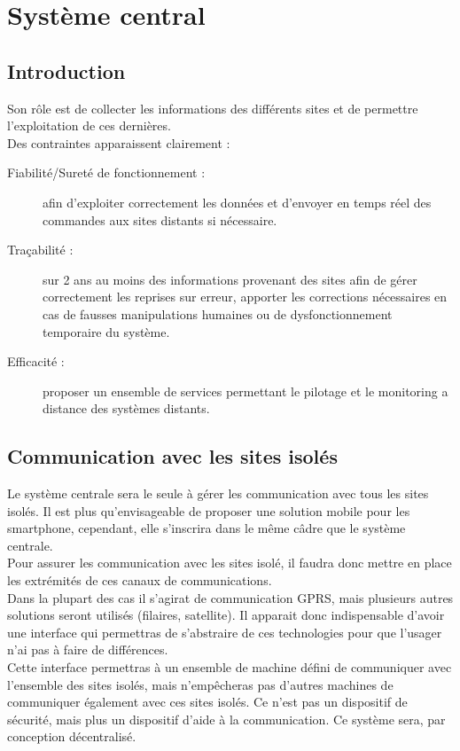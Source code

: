 \section{Système central}

    \subsection{Introduction}
		Son rôle est de collecter les informations des différents sites et de permettre l'exploitation de ces dernières.\\
		Des contraintes apparaissent clairement : 
		\begin{description}
				\item[Fiabilité/Sureté de fonctionnement :] afin d'exploiter correctement les données et d'envoyer en temps réel des commandes aux sites distants si nécessaire.
				\item[Traçabilité :] sur 2 ans au moins des informations provenant des sites afin de gérer correctement les reprises sur erreur, apporter les corrections nécessaires en cas de fausses manipulations humaines ou de dysfonctionnement temporaire du système.
				\item[Efficacité :] proposer un ensemble de services permettant le pilotage et le monitoring a distance des systèmes distants.
		\end{description}


    \subsection{Communication avec les sites isolés}
    
        Le système centrale sera le seule à gérer les communication avec tous les sites isolés.
        Il est plus qu'envisageable de proposer une solution mobile pour les smartphone, cependant, elle s'inscrira dans le même câdre que le système centrale.\\
        
        Pour assurer les communication avec les sites isolé, il faudra donc mettre en place les extrémités de ces canaux de communications.\\
        Dans la plupart des cas il s'agirat de communication GPRS, mais plusieurs autres solutions seront utilisés (filaires, satellite).
        Il apparait donc indispensable d'avoir une interface qui permettras de s'abstraire de ces technologies pour que l'usager n'ai pas à faire de différences.\\
        Cette interface permettras à un ensemble de machine défini de communiquer avec l'ensemble des sites isolés, mais n'empêcheras pas d'autres machines de communiquer également avec ces sites isolés. Ce n'est pas un dispositif de sécurité, mais plus un dispositif d'aide à la communication. Ce système sera, par conception décentralisé.\\
        
